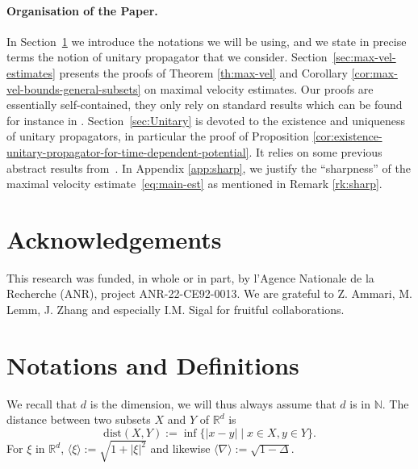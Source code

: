 \documentclass[12pt]{article}
\newcommand{\jnabla}{{\langle\nabla\rangle}}
\newcommand{\dXY}{{\mathrm{dist}(X,Y)}}
\theoremstyle{plain}
\begin{document}
\paragraph{Organisation of the Paper.}
In Section~\ref{sec:Notations-Definitions} we introduce the notations we will be using, and we state in precise terms the notion of unitary propagator that we consider. Section~\ref{sec:max-vel-estimates} presents the proofs of Theorem \ref{th:max-vel} and Corollary \ref{cor:max-vel-bounds-general-subsets} on maximal velocity estimates. Our proofs are essentially self-contained, they only rely on standard results which can be found for instance in \cite{ReedSimon1,reed_sim_vol2}. Section~\ref{sec:Unitary} is devoted to the existence and uniqueness of unitary propagators, in particular the proof of Proposition \ref{cor:existence-unitary-propagator-for-time-dependent-potential}. It relies on some previous abstract results from~\cite{AmmariBreteaux}. 
In Appendix \ref{app:sharp}, we justify the ``sharpness'' of the maximal velocity estimate~\eqref{eq:main-est} as mentioned in Remark \ref{rk:sharp}. 


\section*{Acknowledgements}
This research was funded, in whole or in part, by l’Agence Nationale de la Recherche
(ANR), project ANR-22-CE92-0013. We are grateful to Z. Ammari, M. Lemm, J. Zhang and especially I.M. Sigal for fruitful collaborations. 

\section{Notations and Definitions}\label{sec:Notations-Definitions}


We recall that $d$ is the dimension, we will thus always assume that $d$ is in $\mathbb{N}$. The distance between two subsets $X$ and $Y$ of $\mathbb{R}^d$ is
\begin{equation*}
    \dXY:=\inf\{|x-y|\mid x\in X, y\in Y\}.
\end{equation*}
For $\xi$ in $\mathbb{R}^d$, $\langle\xi\rangle:=\sqrt{1+|\xi|^2}$ and likewise $\jnabla := \sqrt{1-\Delta}$.
\end{document}
